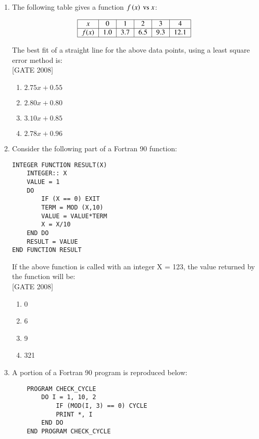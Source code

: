 \documentclass[journal,12pt,onecolumn]{IEEEtran}
\theoremstyle{remark}
\begin{document}
\begin{enumerate}
\item The following table gives a function $f\left(x\right)\text{ vs }x$:



\[
\begin{tabular}{|c|c|c|c|c|c|}
\hline
$x$ & 0 & 1 & 2 & 3 & 4 \\
\hline
$f(x)$ & 1.0 & 3.7 & 6.5 & 9.3 & 12.1 \\
\hline
\end{tabular}
\]

The best fit of a straight line for the above data points, using a least square error method is:
\\ \text{ }\hfill{[GATE 2008]}


\begin{multicols}{4}
    \begin{enumerate}
    \item $2.75x + 0.55$
    \item $2.80x + 0.80$
    \item $3.10x + 0.85$
    \item $2.78x + 0.96$
\end{enumerate}
\end{multicols}



\item Consider the following part of a Fortran 90 function:

\begin{verbatim}
INTEGER FUNCTION RESULT(X)
    INTEGER:: X
    VALUE = 1
    DO
        IF (X == 0) EXIT
        TERM = MOD (X,10)
        VALUE = VALUE*TERM
        X = X/10
    END DO
    RESULT = VALUE
END FUNCTION RESULT
\end{verbatim}

If the above function is called with an integer X = 123, the value returned by the function will be: \\ \text{ }\hfill{[GATE 2008]}
\begin{multicols}{4}
\begin{enumerate}
    \item 0
    \item 6
    \item 9
    \item 321
\end{enumerate}
\end{multicols}
\item A portion of a Fortran 90 program is reproduced below:

\begin{verbatim}
    PROGRAM CHECK_CYCLE
        DO I = 1, 10, 2
            IF (MOD(I, 3) == 0) CYCLE
            PRINT *, I
        END DO
    END PROGRAM CHECK_CYCLE
\end{verbatim}


\end{enumerate}
\end{document}
